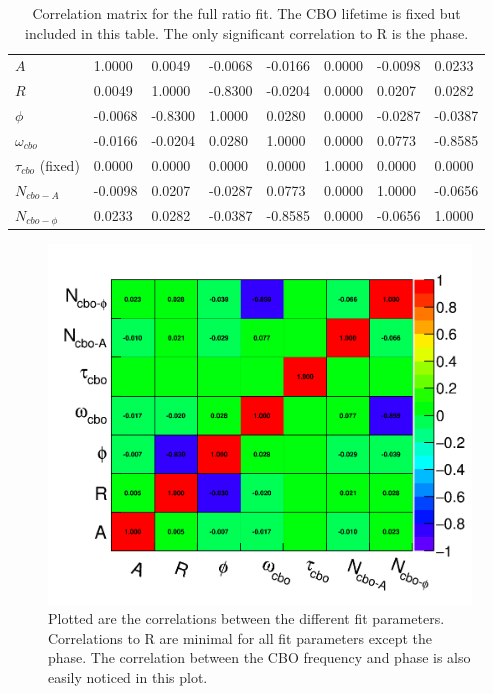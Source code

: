 	\begin{table}[]
	\setlength\tabcolsep{0pt}
	\begin{tabular*}{\linewidth}{@{\extracolsep{\fill}}lLBLLLLL}
	  \toprule
	            &  &  & \thead{$\phi$} &  &  &  &  \\
	  \midrule
		$A$    			 	 &  1.0000  &  0.0049  & -0.0068  & -0.0166  &  0.0000  & -0.0098  &  0.0233  \\
		$R$     			 &  0.0049  &  1.0000  & -0.8300  & -0.0204  &  0.0000  &  0.0207  &  0.0282  \\
		$\phi$   			 & -0.0068  & -0.8300  &  1.0000  &  0.0280  &  0.0000  & -0.0287  & -0.0387  \\
		$\omega_{cbo}$   	 & -0.0166  & -0.0204  &  0.0280  &  1.0000  &  0.0000  &  0.0773  & -0.8585  \\
		$\tau_{cbo}$ (fixed) &  0.0000  &  0.0000  &  0.0000  &  0.0000  &  1.0000  &  0.0000  &  0.0000  \\
		$N_{cbo-A}$   	 	 & -0.0098  &  0.0207  & -0.0287  &  0.0773  &  0.0000  &  1.0000  & -0.0656  \\
		$N_{cbo-\phi}$   	 &  0.0233  &  0.0282  & -0.0387  & -0.8585  &  0.0000  & -0.0656  &  1.0000  \\
	  \bottomrule
	\end{tabular*}
	\caption{Correlation matrix for the full ratio fit. The CBO lifetime is fixed but included in this table. The only significant correlation to R is the \gmtwo phase.}
	\label{Tab:CorrMat}
	\end{table}

	\begin{figure}[]
		\centering
		\includegraphics[width=\textwidth]{CorrelationMatrix}
	    \caption[CorrelationMatrix]{Plotted are the correlations between the different fit parameters. Correlations to R are minimal for all fit parameters except the \gmtwo phase. The correlation between the CBO frequency and phase is also easily noticed in this plot.}
	    \label{fig:CorrelationMatrix}
	\end{figure}

